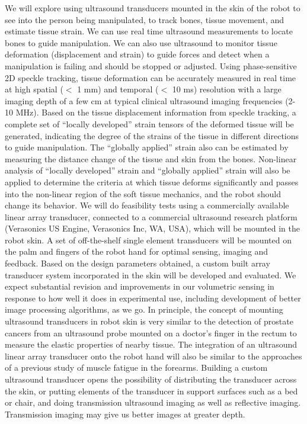 \documentclass[letterpaper,12pt,fullpage]{article}
\begin{document}
We will explore using ultrasound transducers mounted in the skin
of the robot to see into the person being manipulated, to track bones,
tissue movement, and estimate tissue strain.
We can use real time ultrasound measurements
to locate bones to guide manipulation.
We can also use ultrasound to monitor tissue deformation (displacement and
strain) to guide forces and detect when a manipulation is failing and
should be stopped or adjusted.
Using phase-sensitive 2D speckle
tracking,
tissue deformation can be accurately
measured in real time at high spatial ($<$ 1 mm) and temporal ($<$ 10 ms)
resolution with a large imaging depth of a few cm at typical clinical
ultrasound imaging frequencies (2-10 MHz).
Based on the tissue displacement
information from speckle tracking, a complete set of “locally developed” strain
tensors of the deformed tissue will be generated, indicating the
degree of the strains of the tissue in different directions to guide
manipulation.
The ``globally applied''
strain also can be estimated by measuring the distance change of the
tissue and skin from the bones.
Non-linear analysis of ``locally
developed'' strain and ``globally applied'' strain will also
be applied to determine the criteria
at which tissue deforms significantly and passes into the
non-linear region of the soft tissue mechanics,
and the robot should change its behavior.
We will do feasibility tests using a
commercially available linear array transducer, connected to a
commercial ultrasound research platform (Verasonics US Engine, Verasonics Inc,
WA, USA), which will be mounted in the robot skin. A
set of off-the-shelf single element transducers will be mounted on the
palm and fingers of the robot hand for optimal sensing, imaging and
feedback. Based on the design parameters obtained, a custom
built array transducer system incorporated in the skin will be
developed and evaluated. We expect substantial revision and
improvements in our volumetric sensing in response to how well it does
in experimental use, including development of
better image processing algorithms, as we go.
In principle, the concept of mounting
ultrasound transducers in
robot skin is very similar to the
detection of prostate cancers from an ultrasound probe mounted
on a doctor's finger in the rectum to measure
the elastic properties of nearby tissue.
The integration of an ultrasound linear array
transducer onto the robot hand will also be similar to the approaches
of a previous study of muscle fatigue in the forearms.
Building a custom ultrasound transducer opens the possibility of distributing
the transducer across the skin, or putting
elements of the transducer in support surfaces such as a
bed or chair, and doing transmission
ultrasound imaging as well as reflective imaging. Transmission imaging
may give us better images at greater depth.
\end{document}

